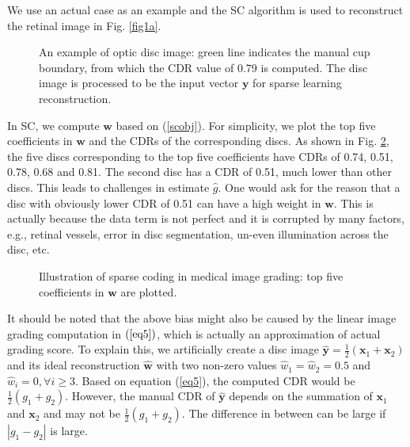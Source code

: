 \documentclass[journal]{IEEEtran}
\begin{document}
    We use an actual  case  as an example and the SC \cite{sparsecoding} algorithm is used to reconstruct the retinal image in Fig. \ref{fig1a}.
     \begin{figure}
    	\caption{An example of optic disc image: green line indicates the manual cup boundary, from which the CDR value of 0.79 is computed. The disc image is processed to be the input vector $\textbf{y}$ for sparse learning reconstruction. } \label{fig1}
    \end{figure}
 In SC, we compute $\textbf{w}$ based on (\ref{scobj}).
 For simplicity, we plot the top five coefficients in $\textbf{w}$ and the CDRs of the corresponding discs. As shown in Fig. \ref{fig2}, the five discs corresponding to the top five coefficients have CDRs of 0.74, 0.51, 0.78, 0.68 and 0.81.
  The second disc has a CDR of 0.51, much lower than other discs.   This   leads to challenges in estimate $\hat{g}$.
  One would ask for the reason that a disc with obviously lower CDR of 0.51 can have a high weight in $\textbf{w}$. This is actually because the data term is not perfect and it is corrupted by many factors, e.g., retinal vessels, error in disc segmentation, un-even illumination across the disc, etc.
       \begin{figure}
     	\caption{Illustration of sparse coding in medical image grading: top five  coefficients in $\textbf{w}$ are plotted.  } \label{fig2}
     \end{figure}


     It should be noted that the above bias might also be caused by the linear image grading computation in $(\ref{eq5})$, which   is actually an approximation of actual grading score.
To explain this, we  artificially create a disc  image  $\hat{\textbf{y}}=\frac{1}{2}(\textbf{x}_1+\textbf{x}_2)$ and its ideal reconstruction  $\hat{\textbf{w}}$ with two non-zero values $\hat{w}_1=\hat{w}_2=0.5$ and   $\hat{w}_i =0, \forall i\geq 3$. Based on equation (\ref{eq5}), the computed CDR would be $\frac{1}{2}(g_1+g_2)$. However, the manual CDR of $\hat{\textbf{y}}$ depends on the summation of $\textbf{x}_1$ and $\textbf{x}_2$ and may not be $\frac{1}{2}(g_1+g_2)$.  The difference in between  can be large if  $|g_1-g_2|$ is large.
\end{document}
